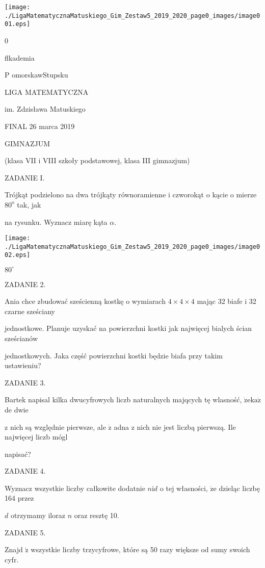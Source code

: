 \documentclass[a4paper,12pt]{article}
\begin{document}
\begin{center}
\texttt{[image: ./LigaMatematycznaMatuskiego\_Gim\_Zestaw5\_2019\_2020\_page0\_images/image001.eps]}
\end{center}
0

flkademia

P omorskawStupsku

LIGA MATEMATYCZNA

im. Zdzisława Matuskiego

FINAL 26 marca 2019

GIMNAZJUM

(klasa VII i VIII szkoły podstawowej, klasa III gimnazjum)

ZADANIE I.

Trójkąt podzielono na dwa trójkąty równoramienne i czworokąt o kącie o mierze $80^{\mathrm{o}}$ tak, jak

na rysunku. Wyznacz miarę kąta $\alpha.$
\begin{center}
\texttt{[image: ./LigaMatematycznaMatuskiego\_Gim\_Zestaw5\_2019\_2020\_page0\_images/image002.eps]}
\end{center}
$80^{\circ}$

ZADANIE 2.

Ania chce zbudować sześcienną kostkę o wymiarach $4\times 4\times 4$ mając 32 biafe i 32 czarne sześciany

jednostkowe. Planuje uzyskać na powierzchni kostki jak najwięcej bialych ścian sześcianów

jednostkowych. Jaka część powierzchni kostki będzie biafa przy takim ustawieniu?

ZADANIE 3.

Bartek napisal kilka dwucyfrowych liczb naturalnych majqcych tę wlasność, $\dot{\mathrm{z}}\mathrm{e} \mathrm{k}\mathrm{a}\dot{\mathrm{z}}$ de dwie

z nich są względnie pierwsze, ale $\dot{\mathrm{z}}$ adna z nich nie jest liczbą pierwszą. Ile najwięcej liczb mógl

napisać?

ZADANIE 4.

Wyznacz wszystkie liczby całkowite dodatnie $n\mathrm{i}d$ o tej własności, $\dot{\mathrm{z}}\mathrm{e}$ dzieląc liczbę 164 przez

$d$ otrzymamy iloraz $n$ oraz resztę 10.

ZADANIE 5.

Znajd $\acute{\mathrm{z}}$ wszystkie liczby trzycyfrowe, które są 50 razy większe od sumy swoich cyfr.
\end{document}
